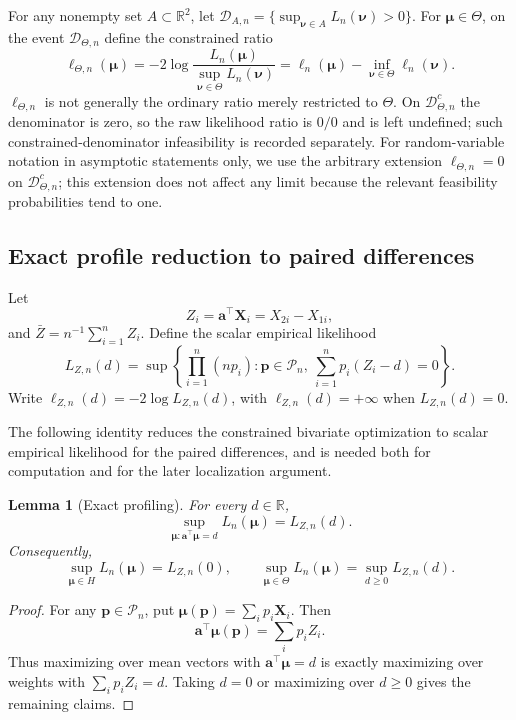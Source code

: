 \documentclass[11pt]{article}
\newtheorem{lemma}[theorem]{Lemma}
\theoremstyle{remark}
\newcommand{\R}{\mathbb{R}}
\begin{document}
For any nonempty set $A\subset\R^2$, let $\mathcal D_{A,n}=\{\sup_{\boldsymbol{\nu}\in A}L_n(\boldsymbol{\nu})>0\}$. For $\boldsymbol{\mu}\in\Theta$, on the event $\mathcal D_{\Theta,n}$ define the constrained ratio
\begin{equation}\label{eq:elltheta}
  \ell_{\Theta,n}(\boldsymbol{\mu})
  =
  -2\log
  \frac{L_n(\boldsymbol{\mu})}{\sup_{\boldsymbol{\nu}\in\Theta}L_n(\boldsymbol{\nu})}
  =
  \ell_n(\boldsymbol{\mu})-\inf_{\boldsymbol{\nu}\in\Theta}\ell_n(\boldsymbol{\nu}).
\end{equation}
$\ell_{\Theta,n}$ is not generally the ordinary ratio merely restricted to $\Theta$. On $\mathcal D_{\Theta,n}^{c}$ the denominator is zero, so the raw likelihood ratio is $0/0$ and is left undefined; such constrained-denominator infeasibility is recorded separately. For random-variable notation in asymptotic statements only, we use the arbitrary extension $\ell_{\Theta,n}=0$ on $\mathcal D_{\Theta,n}^{c}$; this extension does not affect any limit because the relevant feasibility probabilities tend to one.

\subsection{Exact profile reduction to paired differences}

Let
$$
  Z_i=\boldsymbol{a}^\top \boldsymbol{X}_i=X_{2i}-X_{1i},
$$
and $\bar Z=n^{-1}\sum_{i=1}^n Z_i$. Define the scalar empirical likelihood
$$
  L_{Z,n}(d)
  =
  \sup\left\{
  \prod_{i=1}^n(np_i):
  \boldsymbol{p}\in\mathcal P_n,\ 
  \sum_{i=1}^np_i(Z_i-d)=0
  \right\}.
$$
Write $\ell_{Z,n}(d)=-2\log L_{Z,n}(d)$, with $\ell_{Z,n}(d)=+\infty$ when $L_{Z,n}(d)=0$.

The following identity reduces the constrained bivariate optimization to scalar empirical likelihood for the paired differences, and is needed both for computation and for the later localization argument.

\begin{lemma}[Exact profiling]\label{lem:profile}
For every $d\in\R$,
$$
  \sup_{\boldsymbol{\mu}:\boldsymbol{a}^\top\boldsymbol{\mu}=d}L_n(\boldsymbol{\mu})=L_{Z,n}(d).
$$
Consequently,
$$
  \sup_{\boldsymbol{\mu}\in H}L_n(\boldsymbol{\mu})=L_{Z,n}(0),
  \qquad
  \sup_{\boldsymbol{\mu}\in\Theta}L_n(\boldsymbol{\mu})=\sup_{d\geq0}L_{Z,n}(d).
$$
\end{lemma}

\begin{proof}
For any $\boldsymbol{p}\in\mathcal P_n$, put $\boldsymbol{\mu}(\boldsymbol{p})=\sum_i p_i\boldsymbol{X}_i$.  Then
$$
  \boldsymbol{a}^\top\boldsymbol{\mu}(\boldsymbol{p})=\sum_i p_iZ_i.
$$
Thus maximizing over mean vectors with $\boldsymbol{a}^\top\boldsymbol{\mu}=d$ is exactly maximizing over weights with $\sum_i p_iZ_i=d$.  Taking $d=0$ or maximizing over $d\geq0$ gives the remaining claims.
\end{proof}
\end{document}
